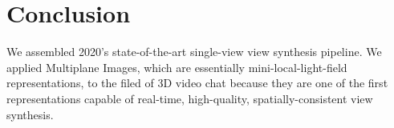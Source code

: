 \section{Conclusion}\label{sec:conclusion}

We assembled 2020’s state-of-the-art single-view view synthesis pipeline. We applied Multiplane Images, which are essentially mini-local-light-field representations, to the filed of 3D video chat because they are one of the first representations capable of real-time, high-quality, spatially-consistent view synthesis.